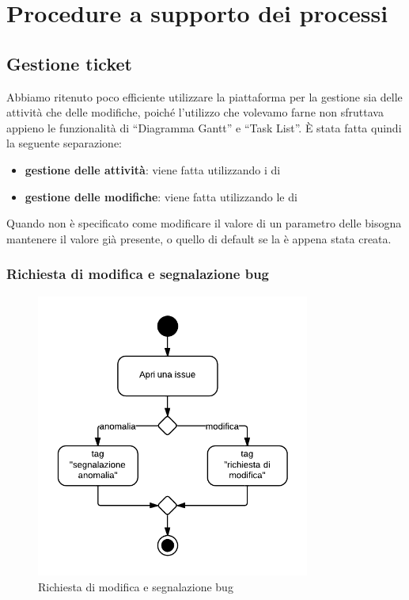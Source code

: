 \section{Procedure a supporto dei processi}


\subsection{Gestione ticket}
\label{gestioneticket}

Abbiamo ritenuto poco efficiente utilizzare la piattaforma  per la gestione sia delle attività che delle modifiche, poiché l'utilizzo che volevamo farne non sfruttava appieno le funzionalità di ``Diagramma Gantt'' e ``Task List''. È stata fatta quindi la seguente separazione:
\begin{itemize}
 \item \textbf{gestione delle attività}: viene fatta utilizzando i  di 
 \item \textbf{gestione delle modifiche}: viene fatta utilizzando le  di 
\end{itemize}

Quando non è specificato come modificare il valore di un parametro delle  bisogna mantenere il valore già presente, o quello di default se la  è appena stata creata.

\subsubsection{Richiesta di modifica e segnalazione bug}
\label{aperturaissue}

\begin{figure}[H]
    \centering
    \includegraphics[width=9cm]{uml-processi/richiesta_di_modifica_e_segnalazione_bug.png}
    \caption{Richiesta di modifica e segnalazione bug}
\end{figure}

